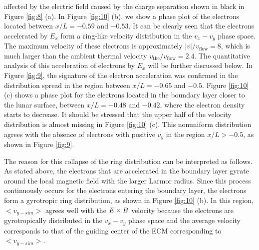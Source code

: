 \documentclass[draft,jgrga]{agutex2015}
\begin{document}
\begin{article}
affected by the electric field caused by the charge separation
shown in black in Figure \ref{fig:8} (a).
In Figure \ref{fig:10} (b), we show a phase plot of the electrons located between 
$x/L = -0.59$ and $-0.53$.
It can be clearly seen that the electrons accelerated by $E_x$ form 
a ring-like velocity distribution in the $v_x-v_y$ phase space.
The maximum velocity of these electrons is approximately 
$|v|/v_\mathrm{flow} = 8$, which is much larger than 
the ambient thermal velocity $v_{\mathrm{the}}/v_\mathrm{flow} = 2.4$. 
The quantitative analysis of this acceleration of electrons by $E_x$ will be further
discussed below.
%
In Figure \ref{fig:9},
the signature of the electron acceleration
was confirmed in the distribution spread in the region between $x/L =-0.65$ and $-0.5$.
Figure \ref{fig:10} (c)
shows a phase plot for the electrons located in the boundary layer 
closer to the lunar surface, between $x/L = -0.48$ and $-0.42$, 
where the electron density starts to decrease.
It should be stressed that 
the upper half of the velocity distribution is almost missing in Figure \ref{fig:10} (c).
This nonuniform distribution agrees with the absence of
electrons with positive $v_y$ in
the region $x/L > -0.5$, as shown in Figure \ref{fig:9}.

The reason for this collapse of the ring distribution can be interpreted 
as follows.
As stated above, the electrons that are accelerated in the boundary layer
gyrate around the local magnetic field with the larger Larmor radius.
Since this process continuously occurs for the electrons 
entering the boundary layer,
the electrons form a gyrotropic ring distribution,
as shown in Figure \ref{fig:10} (b).
In this region, 
$<v_{y-sim}>$ agrees well with 
the $\mbox{\boldmath $E$} \times \mbox{\boldmath $B$}$ velocity
because the electrons are gyrotropically 
distributed in the $v_x-v_y$ phase space and the average velocity 
corresponds to that of the guiding center of the ECM corresponding to $<v_{y-sim}>$.


\end{article}
\end{document}
